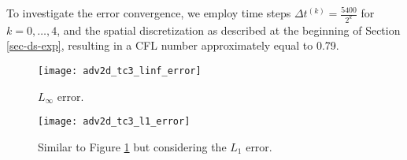 To investigate the error convergence, we employ time steps $\Delta t^{(k)}=\frac{5400}{2^{k}}$ for 
$k = 0, \ldots, 4$, and the spatial discretization as described at the beginning of Section \ref{sec-ds-exp},
resulting in a CFL number approximately equal to 0.79.
\begin{figure}[!htb]
\centering
\texttt{[image: adv2d\_tc3\_linf\_error]}
\caption{$L_{\infty}$ error.\label{chp-adv2d-sec-exp-adv2-error-linf}}
\end{figure}

\begin{figure}[!htb]
\centering
\texttt{[image: adv2d\_tc3\_l1\_error]}
\caption{Similar to Figure \ref{chp-adv2d-sec-exp-adv2-error-linf} but considering the $L_1$ error.
\label{chp-adv2d-sec-exp-adv2-error-l1}}
\end{figure}

